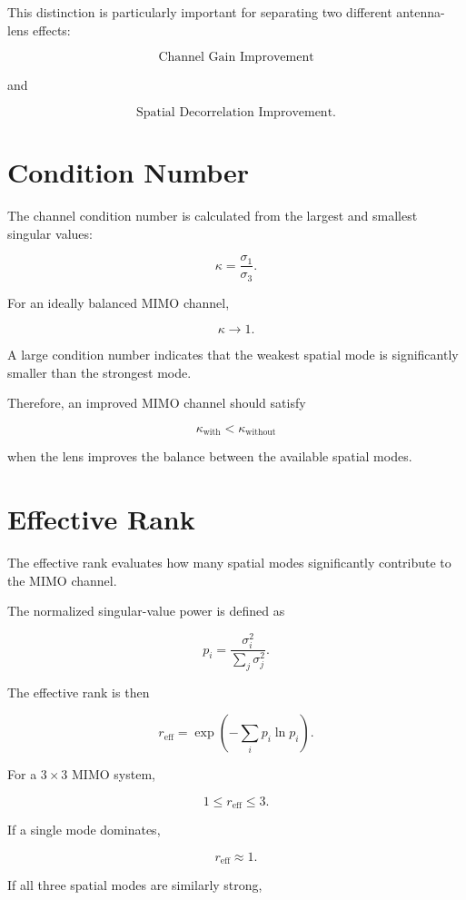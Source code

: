 \documentclass[11pt,a4paper]{article}
\begin{document}
This distinction is particularly important for separating two different antenna-lens effects:

\[
\text{Channel Gain Improvement}
\]

and

\[
\text{Spatial Decorrelation Improvement}.
\]

\section{Condition Number}

The channel condition number is calculated from the largest and smallest singular values:

\[
\kappa
=
\frac{\sigma_1}{\sigma_3}.
\]

For an ideally balanced MIMO channel,

\[
\kappa
\rightarrow 1.
\]

A large condition number indicates that the weakest spatial mode is significantly smaller than the strongest mode.

Therefore, an improved MIMO channel should satisfy

\[
\boxed{
\kappa_{\mathrm{with}}
<
\kappa_{\mathrm{without}}
}
\]

when the lens improves the balance between the available spatial modes.

\section{Effective Rank}

The effective rank evaluates how many spatial modes significantly contribute to the MIMO channel.

The normalized singular-value power is defined as

\[
p_i
=
\frac{\sigma_i^2}
{\displaystyle\sum_j\sigma_j^2}.
\]

The effective rank is then

\[
r_{\mathrm{eff}}
=
\exp
\left(
-\sum_i p_i\ln p_i
\right).
\]

For a $3\times3$ MIMO system,

\[
1
\leq
r_{\mathrm{eff}}
\leq
3.
\]

If a single mode dominates,

\[
r_{\mathrm{eff}}
\approx 1.
\]

If all three spatial modes are similarly strong,
\end{document}
